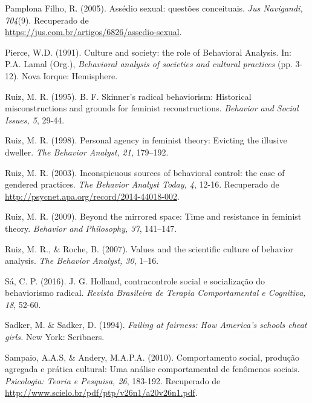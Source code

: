 \hangindent=25pt
\noindent Pamplona Filho, R. (2005). Assédio sexual: questões conceituais. \textit{Jus Navigandi, 704}(9). Recuperado de\\ \url{https://jus.com.br/artigos/6826/assedio-sexual}.

\hangindent=25pt
\noindent Pierce, W.D. (1991). Culture and society: the role of Behavioral Analysis. In: P.A. Lamal (Org.), \textit{Behavioral analysis of societies and cultural practices} (pp. 3-12). Nova Iorque: Hemisphere.

\hangindent=25pt
\noindent Ruiz, M. R. (1995). B. F. Skinner’s radical behaviorism: Historical misconstructions and grounds for feminist reconstructions. \textit{Behavior and Social Issues, 5}, 29-44.

\hangindent=25pt
\noindent Ruiz, M. R. (1998). Personal agency in feminist theory: Evicting the illusive dweller. \textit{The Behavior Analyst, 21}, 179–192.

\hangindent=25pt
\noindent Ruiz, M. R. (2003). Inconspicuous sources of behavioral control: the case of gendered practices. \textit{The Behavior Analyst Today, 4}, 12-16. Recuperado de\\ \url{http://psycnet.apa.org/record/2014-44018-002}.

\hangindent=25pt
\noindent Ruiz, M. R. (2009). Beyond the mirrored space: Time and resistance in feminist theory. \textit{Behavior and Philosophy, 37}, 141–147.

\hangindent=25pt
\noindent Ruiz, M. R., \& Roche, B. (2007). Values and the scientific culture of behavior analysis. \textit{The Behavior Analyst, 30}, 1–16.

\hangindent=25pt
\noindent Sá, C. P. (2016). J. G. Holland, contracontrole social e socialização do behaviorismo radical. \textit{Revista Brasileira de Terapia Comportamental e Cognitiva, 18}, 52-60.

\hangindent=25pt
\noindent Sadker, M. \& Sadker, D. (1994). \textit{Failing at fairness: How America’s schools cheat girls.} New York: Scribners.

\hangindent=25pt
\noindent Sampaio, A.A.S, \& Andery, M.A.P.A. (2010). Comportamento social, produção agregada e prática cultural: Uma análise comportamental de fenômenos sociais. \textit{Psicologia: Teoria e Pesquisa, 26}, 183-192. Recuperado de\\ \url{http://www.scielo.br/pdf/ptp/v26n1/a20v26n1.pdf}.

